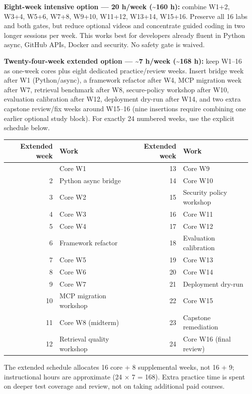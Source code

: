 \documentclass[
  10pt,
]{article}
\begin{document}
\textbf{Eight-week intensive option --- 20 h/week (\textasciitilde160
h):} combine W1+2, W3+4, W5+6, W7+8, W9+10, W11+12, W13+14, W15+16.
Preserve all 16 labs and both gates, but reduce optional videos and
concentrate guided coding in two longer sessions per week. This works
best for developers already fluent in Python async, GitHub APIs, Docker
and security. No safety gate is waived.

\textbf{Twenty-four-week extended option --- \textasciitilde7 h/week
(\textasciitilde168 h):} keep W1--16 as one-week cores plus eight
dedicated practice/review weeks. Insert bridge week after W1
(Python/async), a framework refactor after W4, MCP migration week after
W7, retrieval benchmark after W8, secure-policy workshop after W10,
evaluation calibration after W12, deployment dry-run after W14, and two
extra capstone review/fix weeks around W15--16 (nine insertions require
combining one earlier optional study block). For exactly 24 numbered
weeks, use the explicit schedule below.

\begin{longtable}[]{@{}rlrl@{}}
\toprule\noalign{}
Extended week & Work & Extended week & Work \\
\midrule\noalign{}
\endhead
\bottomrule\noalign{}
\endlastfoot
1 & Core W1 & 13 & Core W9 \\
2 & Python async bridge & 14 & Core W10 \\
3 & Core W2 & 15 & Security policy workshop \\
4 & Core W3 & 16 & Core W11 \\
5 & Core W4 & 17 & Core W12 \\
6 & Framework refactor & 18 & Evaluation calibration \\
7 & Core W5 & 19 & Core W13 \\
8 & Core W6 & 20 & Core W14 \\
9 & Core W7 & 21 & Deployment dry-run \\
10 & MCP migration workshop & 22 & Core W15 \\
11 & Core W8 (midterm) & 23 & Capstone remediation \\
12 & Retrieval quality workshop & 24 & Core W16 (final review) \\
\end{longtable}

The extended schedule allocates 16 core + 8 supplemental weeks, not 16 +
9; instructional hours are approximate (24 × 7 = 168). Extra practice
time is spent on deeper test coverage and review, not on taking
additional paid courses.
\end{document}
